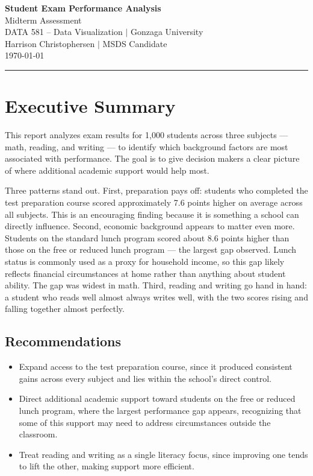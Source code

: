 \documentclass[12pt, letterpaper]{article}
\begin{document}
\begin{center}
    {\LARGE \textbf{Student Exam Performance Analysis}} \\[0.5em]
    {\large Midterm Assessment} \\[0.5em]
    {\normalsize DATA 581 -- Data Visualization $\mid$ Gonzaga University} \\[0.3em]
    {\normalsize Harrison Christophersen $\mid$ MSDS Candidate} \\[0.3em]
    {\normalsize \today}
\end{center}

\vspace{1em}
\hrule
\vspace{1.5em}

\section{Executive Summary}

This report analyzes exam results for 1,000 students across three subjects --- math, reading, and writing --- to identify which background factors are most associated with performance. The goal is to give decision makers a clear picture of where additional academic support would help most.

Three patterns stand out. First, preparation pays off: students who completed the test preparation course scored approximately 7.6 points higher on average across all subjects. This is an encouraging finding because it is something a school can directly influence. Second, economic background appears to matter even more. Students on the standard lunch program scored about 8.6 points higher than those on the free or reduced lunch program --- the largest gap observed. Lunch status is commonly used as a proxy for household income, so this gap likely reflects financial circumstances at home rather than anything about student ability. The gap was widest in math. Third, reading and writing go hand in hand: a student who reads well almost always writes well, with the two scores rising and falling together almost perfectly.

\subsection*{Recommendations}
\begin{itemize}
    \item Expand access to the test preparation course, since it produced consistent gains across every subject and lies within the school's direct control.
    \item Direct additional academic support toward students on the free or reduced lunch program, where the largest performance gap appears, recognizing that some of this support may need to address circumstances outside the classroom.
    \item Treat reading and writing as a single literacy focus, since improving one tends to lift the other, making support more efficient.
\end{itemize}
\end{document}
